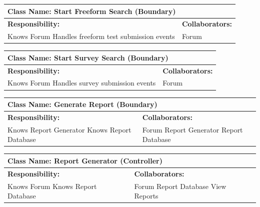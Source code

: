 \documentclass[]{article}
\begin{document}
	\begin{table}[H]
		\centering
		\begin{tabular}{|p{7cm}|p{7cm}|}
		\hline 
		 \multicolumn{2}{|l|}{\textbf{Class Name: Start Freeform Search (Boundary)}} \\
		\hline
		\textbf{Responsibility:} & \textbf{Collaborators:} \\
		\hline
		Knows Forum \newline
		Handles freeform test submission events & Forum \\
		\hline
		\end{tabular}
	\end{table}
	\begin{table}[H]
		\centering
		\begin{tabular}{|p{7cm}|p{7cm}|}
		\hline 
		 \multicolumn{2}{|l|}{\textbf{Class Name: Start Survey Search (Boundary)}} \\
		\hline
		\textbf{Responsibility:} & \textbf{Collaborators:} \\
		\hline
		Knows Forum \newline
		Handles survey submission events & Forum \\
		\hline
		\end{tabular}
	\end{table}
	\begin{table}[H]
		\centering
		\begin{tabular}{|p{7cm}|p{7cm}|}
		\hline 
		 \multicolumn{2}{|l|}{\textbf{Class Name: Generate Report (Boundary)}} \\
		\hline
		\textbf{Responsibility:} & \textbf{Collaborators:} \\
		\hline
		Knows Report Generator  \newline
		Knows Report Database & Forum \newline	
		Report Generator \newline
		Report Database \\
		\hline
		\end{tabular}
	\end{table} 

	\begin{table}[H]
		\centering
		\begin{tabular}{|p{7cm}|p{7cm}|}
		\hline 
		 \multicolumn{2}{|l|}{\textbf{Class Name: Report Generator (Controller)}} \\
		\hline
		\textbf{Responsibility:} & \textbf{Collaborators:} \\
		\hline
		Knows Forum  \newline
		Knows Report Database & Forum\newline		
		Report Database  \newline
		View Reports \\
		\hline
		\end{tabular}
	\end{table} 	
	
\end{document}
